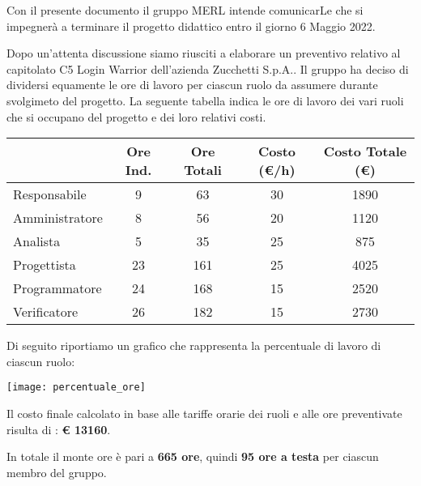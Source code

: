 Con il presente documento il gruppo MERL intende comunicarLe che si impegnerà a terminare il progetto didattico entro il giorno 6 Maggio 2022.

Dopo un’attenta discussione siamo riusciti a elaborare un preventivo relativo al capitolato C5 Login Warrior dell’azienda Zucchetti S.p.A.. Il gruppo ha deciso di dividersi equamente le ore di lavoro per ciascun ruolo da assumere durante svolgimeto del progetto. La seguente tabella indica le ore di lavoro dei vari ruoli che si occupano del progetto e dei loro relativi costi.

\begin{center}
  \begin{tabular}{ |l|c|c|c|c| }
    \hline
                   & Ore Ind. & Ore Totali & Costo (€/h) & Costo Totale (€) \\
    \hline
    Responsabile   & 9   & 63         & 30        & 1890             \\
    \hline
    Amministratore & 8   & 56         & 20        & 1120             \\
    \hline
    Analista       & 5   & 35         & 25        & 875              \\
    \hline
    Progettista    & 23  & 161        & 25        & 4025             \\
    \hline
    Programmatore  & 24  & 168        & 15        & 2520             \\
    \hline
    Verificatore   & 26  & 182        & 15        & 2730             \\
    \hline
  \end{tabular}
\end{center}

Di seguito riportiamo un grafico che rappresenta la percentuale di lavoro di ciascun ruolo:
\begin{center}
  \texttt{[image: percentuale\_ore]}
\end{center}

Il costo finale calcolato in base alle tariffe orarie dei ruoli e alle ore preventivate risulta di :
\textbf{€ 13160}.

In totale il monte ore è pari a \textbf{665 ore}, quindi \textbf{95 ore a testa} per ciascun membro del gruppo.
